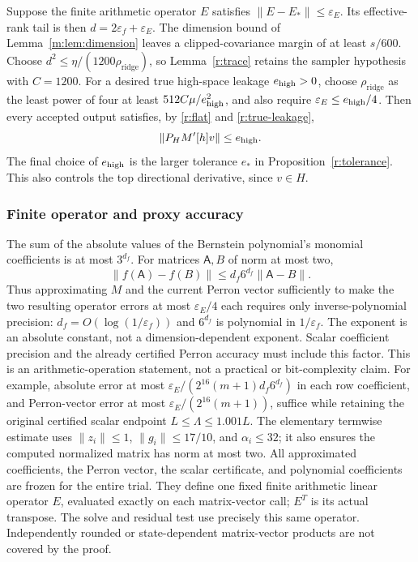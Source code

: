 \documentclass[11pt]{amsart}
\theoremstyle{definition}\newtheorem{definition}[theorem]{Definition}
\theoremstyle{remark}\newtheorem{remark}[theorem]{Remark}
\numberwithin{equation}{section}
\begin{document}
Suppose the finite arithmetic operator $E$ satisfies
$\|E-E_*\|\le\varepsilon_E$. Its effective-rank tail is then
$d=2\varepsilon_f+\varepsilon_E$.
The dimension bound of Lemma~\ref{m:lem:dimension} leaves a clipped-covariance margin of at least $s/600$.
Choose $d^2\le\eta/(1200\rho_{\mathrm{ridge}})$, so Lemma~\ref{r:trace} retains
the sampler hypothesis with $C=1200$.
For a desired true high-space leakage $e_{\rm high}>0$, choose $\rho_{\mathrm{ridge}}$
as the least power of four at least $512C\mu/e_{\rm high}^2$, and
also require $\varepsilon_E\le e_{\rm high}/4$.
Then every accepted output satisfies, by \eqref{r:flat} and
\eqref{r:true-leakage},
\[
 \|P_HM'[h]v\|\le e_{\rm high}.
\]
The final choice of $e_{\rm high}$ is the larger tolerance $e_*$
in Proposition~\ref{r:tolerance}. This also controls the top directional
derivative, since $v\in H$.

\subsubsection{Finite operator and proxy accuracy}\label{r:finite}
The sum of the absolute values of the Bernstein polynomial's monomial
coefficients is at most
$3^{d_f}$. For matrices $\mathsf{A},B$ of norm at most two,
\[
 \|f(\mathsf{A})-f(B)\|\le d_f6^{d_f}\|\mathsf{A}-B\|.
\]
Thus approximating $M$ and the current Perron vector sufficiently to
make the two resulting operator errors at most $\varepsilon_E/4$ each
requires only inverse-polynomial precision: $d_f=O(\log(1/\varepsilon_f))$
and $6^{d_f}$ is polynomial in $1/\varepsilon_f$.
The exponent is an absolute constant, not a dimension-dependent exponent.
Scalar coefficient precision and the already certified Perron accuracy
must include this factor. This is an arithmetic-operation statement,
not a practical or bit-complexity claim.
For example, absolute error at most
$\varepsilon_E/(2^{16}(m+1)d_f6^{d_f})$ in each row coefficient, and
Perron-vector error at most $\varepsilon_E/(2^{16}(m+1))$, suffice while retaining the original certified scalar endpoint
$L\le\Lambda\le1.001L$. The elementary termwise estimate uses
$\|z_i\|\le1$, $\|g_i\|\le17/10$, and $\alpha_i\le32$;
it also ensures the computed normalized matrix has norm at most two.
All approximated coefficients, the Perron vector, the scalar certificate,
and polynomial coefficients are frozen for the entire trial. They define
one fixed finite arithmetic linear operator $E$, evaluated exactly on
each matrix-vector call; $E^T$ is its actual transpose. The solve and
residual test use precisely this same operator. Independently rounded or
state-dependent matrix-vector products are not covered by the proof.
\end{document}
